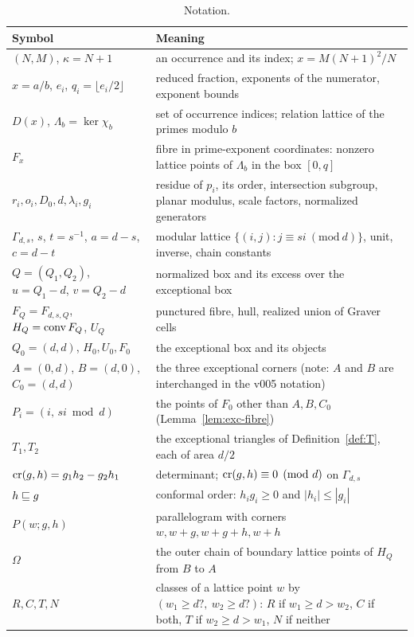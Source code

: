 \begin{table}[ht]
\centering\small
\begin{tabular}{@{}p{4.6cm}p{10.4cm}@{}}
\toprule
Symbol & Meaning\\
\midrule
$(N,M)$, $\kappa=N+1$ & an occurrence and its index; $x=M(N+1)^2/N$\\
$x=a/b$, $e_i$, $q_i=\lfloor e_i/2\rfloor$ & reduced fraction, exponents of the numerator, exponent bounds\\
$D(x)$, $\Lambda_b=\ker\chi_b$ & set of occurrence indices; relation lattice of the primes modulo $b$\\
$F_x$ & fibre in prime-exponent coordinates: nonzero lattice points of $\Lambda_b$ in the box $[0,q]$\\
$r_i,o_i,D_0,d,\lambda_i,g_i$ & residue of $p_i$, its order, intersection subgroup, planar modulus, scale factors, normalized generators\\
$\Gamma_{d,s}$, $s$, $t=s^{-1}$, $a=d-s$, $c=d-t$ & modular lattice $\{(i,j):j\equiv si\ (\mathrm{mod}\ d)\}$, unit, inverse, chain constants\\
$Q=(Q_1,Q_2)$, $u=Q_1-d$, $v=Q_2-d$ & normalized box and its excess over the exceptional box\\
$F_Q=F_{d,s,Q}$, $H_Q=\operatorname{conv} F_Q$, $U_Q$ & punctured fibre, hull, realized union of Graver cells\\
$Q_0=(d,d)$, $H_0,U_0,F_0$ & the exceptional box and its objects\\
$A=(0,d)$, $B=(d,0)$, $C_0=(d,d)$ & the three exceptional corners (note: $A$ and $B$ are interchanged in the v005 notation)\\
$P_i=(i,\,si\bmod d)$ & the points of $F_0$ other than $A,B,C_0$ (Lemma~\ref{lem:exc-fibre})\\
$T_1,T_2$ & the exceptional triangles of Definition~\ref{def:T}, each of area $d/2$\\
$\operatorname{cr}(g,h)=g_1h_2-g_2h_1$ & determinant; $\operatorname{cr}(g,h)\equiv0\pmod d$ on $\Gamma_{d,s}$\\
$h\sqsubseteq g$ & conformal order: $h_ig_i\ge0$ and $|h_i|\le|g_i|$\\
$P(w;g,h)$ & parallelogram with corners $w,w+g,w+g+h,w+h$\\
$\Omega$ & the outer chain of boundary lattice points of $H_Q$ from $B$ to $A$\\
$R,C,T,N$ & classes of a lattice point $w$ by $(w_1\ge d?,\ w_2\ge d?)$: $R$ if $w_1\ge d>w_2$, $C$ if both, $T$ if $w_2\ge d>w_1$, $N$ if neither\\
\bottomrule
\end{tabular}
\caption{Notation.}\label{tab:notation-app}
\end{table}

